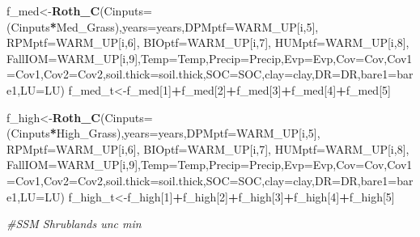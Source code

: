 \documentclass[
  10pt,
  b5paper,
]{book}
\newenvironment{Shaded}{\begin{snugshade}}{\end{snugshade}}
\newcommand{\CommentTok}[1]{\textcolor[rgb]{0.56,0.35,0.01}{\textit{#1}}}
\newcommand{\DataTypeTok}[1]{\textcolor[rgb]{0.13,0.29,0.53}{#1}}
\newcommand{\DecValTok}[1]{\textcolor[rgb]{0.00,0.00,0.81}{#1}}
\newcommand{\KeywordTok}[1]{\textcolor[rgb]{0.13,0.29,0.53}{\textbf{#1}}}
\newcommand{\NormalTok}[1]{#1}
\newcommand{\OperatorTok}[1]{\textcolor[rgb]{0.81,0.36,0.00}{\textbf{#1}}}
\begin{document}
\begin{Shaded}
\begin{Highlighting}[]
\NormalTok{f_med<-}\KeywordTok{Roth_C}\NormalTok{(}\DataTypeTok{Cinputs=}\NormalTok{(Cinputs}\OperatorTok{*}\NormalTok{Med_Grass),}\DataTypeTok{years=}\NormalTok{years,}\DataTypeTok{DPMptf=}\NormalTok{WARM_UP[i,}\DecValTok{5}\NormalTok{], }\DataTypeTok{RPMptf=}\NormalTok{WARM_UP[i,}\DecValTok{6}\NormalTok{], }\DataTypeTok{BIOptf=}\NormalTok{WARM_UP[i,}\DecValTok{7}\NormalTok{], }\DataTypeTok{HUMptf=}\NormalTok{WARM_UP[i,}\DecValTok{8}\NormalTok{], }\DataTypeTok{FallIOM=}\NormalTok{WARM_UP[i,}\DecValTok{9}\NormalTok{],}\DataTypeTok{Temp=}\NormalTok{Temp,}\DataTypeTok{Precip=}\NormalTok{Precip,}\DataTypeTok{Evp=}\NormalTok{Evp,}\DataTypeTok{Cov=}\NormalTok{Cov,}\DataTypeTok{Cov1=}\NormalTok{Cov1,}\DataTypeTok{Cov2=}\NormalTok{Cov2,}\DataTypeTok{soil.thick=}\NormalTok{soil.thick,}\DataTypeTok{SOC=}\NormalTok{SOC,}\DataTypeTok{clay=}\NormalTok{clay,}\DataTypeTok{DR=}\NormalTok{DR,}\DataTypeTok{bare1=}\NormalTok{bare1,}\DataTypeTok{LU=}\NormalTok{LU)}
\NormalTok{f_med_t<-f_med[}\DecValTok{1}\NormalTok{]}\OperatorTok{+}\NormalTok{f_med[}\DecValTok{2}\NormalTok{]}\OperatorTok{+}\NormalTok{f_med[}\DecValTok{3}\NormalTok{]}\OperatorTok{+}\NormalTok{f_med[}\DecValTok{4}\NormalTok{]}\OperatorTok{+}\NormalTok{f_med[}\DecValTok{5}\NormalTok{]}

\NormalTok{f_high<-}\KeywordTok{Roth_C}\NormalTok{(}\DataTypeTok{Cinputs=}\NormalTok{(Cinputs}\OperatorTok{*}\NormalTok{High_Grass),}\DataTypeTok{years=}\NormalTok{years,}\DataTypeTok{DPMptf=}\NormalTok{WARM_UP[i,}\DecValTok{5}\NormalTok{], }\DataTypeTok{RPMptf=}\NormalTok{WARM_UP[i,}\DecValTok{6}\NormalTok{], }\DataTypeTok{BIOptf=}\NormalTok{WARM_UP[i,}\DecValTok{7}\NormalTok{], }\DataTypeTok{HUMptf=}\NormalTok{WARM_UP[i,}\DecValTok{8}\NormalTok{], }\DataTypeTok{FallIOM=}\NormalTok{WARM_UP[i,}\DecValTok{9}\NormalTok{],}\DataTypeTok{Temp=}\NormalTok{Temp,}\DataTypeTok{Precip=}\NormalTok{Precip,}\DataTypeTok{Evp=}\NormalTok{Evp,}\DataTypeTok{Cov=}\NormalTok{Cov,}\DataTypeTok{Cov1=}\NormalTok{Cov1,}\DataTypeTok{Cov2=}\NormalTok{Cov2,}\DataTypeTok{soil.thick=}\NormalTok{soil.thick,}\DataTypeTok{SOC=}\NormalTok{SOC,}\DataTypeTok{clay=}\NormalTok{clay,}\DataTypeTok{DR=}\NormalTok{DR,}\DataTypeTok{bare1=}\NormalTok{bare1,}\DataTypeTok{LU=}\NormalTok{LU)}
\NormalTok{f_high_t<-f_high[}\DecValTok{1}\NormalTok{]}\OperatorTok{+}\NormalTok{f_high[}\DecValTok{2}\NormalTok{]}\OperatorTok{+}\NormalTok{f_high[}\DecValTok{3}\NormalTok{]}\OperatorTok{+}\NormalTok{f_high[}\DecValTok{4}\NormalTok{]}\OperatorTok{+}\NormalTok{f_high[}\DecValTok{5}\NormalTok{]}

\CommentTok{#SSM Shrublands unc min}


\end{Highlighting}
\end{Shaded}
\end{document}
